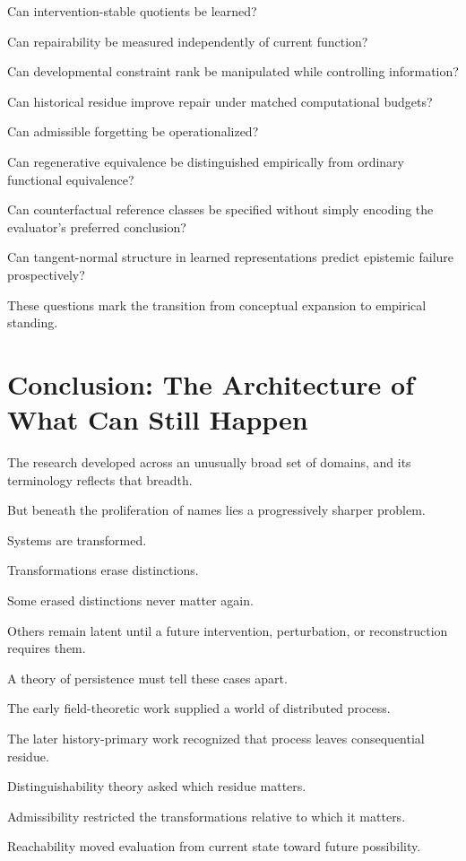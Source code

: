 \documentclass[11pt]{article}
\theoremstyle{remark}
\begin{document}
Can intervention-stable quotients be learned?

Can repairability be measured independently of current function?

Can developmental constraint rank be manipulated while controlling information?

Can historical residue improve repair under matched computational budgets?

Can admissible forgetting be operationalized?

Can regenerative equivalence be distinguished empirically from ordinary functional equivalence?

Can counterfactual reference classes be specified without simply encoding the evaluator's preferred conclusion?

Can tangent-normal structure in learned representations predict epistemic failure prospectively?

These questions mark the transition from conceptual expansion to empirical standing.

\section{Conclusion: The Architecture of What Can Still Happen}

The research developed across an unusually broad set of domains, and its terminology reflects that breadth.

But beneath the proliferation of names lies a progressively sharper problem.

Systems are transformed.

Transformations erase distinctions.

Some erased distinctions never matter again.

Others remain latent until a future intervention, perturbation, or reconstruction requires them.

A theory of persistence must tell these cases apart.

The early field-theoretic work supplied a world of distributed process.

The later history-primary work recognized that process leaves consequential residue.

Distinguishability theory asked which residue matters.

Admissibility restricted the transformations relative to which it matters.

Reachability moved evaluation from current state toward future possibility.
\end{document}
